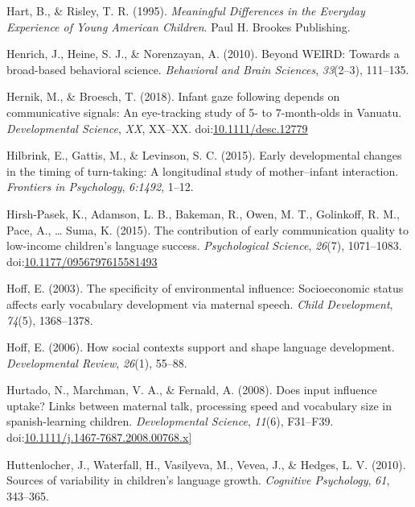 \documentclass[floatsintext,man]{apa6}
\theoremstyle{definition}
\theoremstyle{definition}
\theoremstyle{definition}
\theoremstyle{remark}
\begin{document}
\hypertarget{ref-hart1995meaningful}{}
Hart, B., \& Risley, T. R. (1995). \emph{Meaningful Differences in the
Everyday Experience of Young American Children}. Paul H. Brookes
Publishing.

\hypertarget{ref-henrich2010beyond}{}
Henrich, J., Heine, S. J., \& Norenzayan, A. (2010). Beyond WEIRD:
Towards a broad-based behavioral science. \emph{Behavioral and Brain
Sciences}, \emph{33}(2--3), 111--135.

\hypertarget{ref-hernik2018infant}{}
Hernik, M., \& Broesch, T. (2018). Infant gaze following depends on
communicative signals: An eye-tracking study of 5- to 7-month-olds in
Vanuatu. \emph{Developmental Science}, \emph{XX}, XX--XX.
doi:\href{https://doi.org/10.1111/desc.12779}{10.1111/desc.12779}

\hypertarget{ref-hilbrink2015early}{}
Hilbrink, E., Gattis, M., \& Levinson, S. C. (2015). Early developmental
changes in the timing of turn-taking: A longitudinal study of
mother--infant interaction. \emph{Frontiers in Psychology},
\emph{6:1492}, 1--12.

\hypertarget{ref-hirshpasek2015contribution}{}
Hirsh-Pasek, K., Adamson, L. B., Bakeman, R., Owen, M. T., Golinkoff, R.
M., Pace, A., \ldots{} Suma, K. (2015). The contribution of early
communication quality to low-income children's language success.
\emph{Psychological Science}, \emph{26}(7), 1071--1083.
doi:\href{https://doi.org/10.1177/0956797615581493}{10.1177/0956797615581493}

\hypertarget{ref-hoff2003specificity}{}
Hoff, E. (2003). The specificity of environmental influence:
Socioeconomic status affects early vocabulary development via maternal
speech. \emph{Child Development}, \emph{74}(5), 1368--1378.

\hypertarget{ref-hoff2006social}{}
Hoff, E. (2006). How social contexts support and shape language
development. \emph{Developmental Review}, \emph{26}(1), 55--88.

\hypertarget{ref-hurtado2008does}{}
Hurtado, N., Marchman, V. A., \& Fernald, A. (2008). Does input
influence uptake? Links between maternal talk, processing speed and
vocabulary size in spanish-learning children. \emph{Developmental
Science}, \emph{11}(6), F31--F39.
doi:\href{https://doi.org/10.1111/j.1467-7687.2008.00768.x\%5D}{10.1111/j.1467-7687.2008.00768.x{]}}

\hypertarget{ref-huttenlocher2010sources}{}
Huttenlocher, J., Waterfall, H., Vasilyeva, M., Vevea, J., \& Hedges, L.
V. (2010). Sources of variability in children's language growth.
\emph{Cognitive Psychology}, \emph{61}, 343--365.
\end{document}
